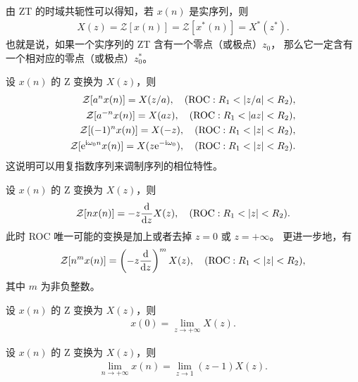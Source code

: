 \begin{corollary}
    由 ZT 的时域共轭性可以得知，若 $x(n)$ 是实序列，则
    \begin{align*}
        X(z) = \mathcal{Z}[x(n)] = \mathcal{Z}[x^*(n)] = X^*(z^*).
    \end{align*}
    也就是说，如果一个实序列的 ZT 含有一个零点（或极点）$z_0$，
    那么它一定含有一个相对应的零点（或极点）$z_0^*$。
\end{corollary}

\begin{property}[Z 域尺度变换]
    设 $x(n)$ 的 Z 变换为 $X(z)$，则
    \begin{align*}
        \mathcal{Z}[a^nx(n)] = X(z/a), \quad (\text{ROC}: R_1 < \left|z/a\right| < R_2), \\
        \mathcal{Z}[a^{-n}x(n)] = X(az), \quad (\text{ROC}: R_1 < \left|az\right| < R_2), \\
        \mathcal{Z}[(-1)^nx(n)] = X(-z), \quad (\text{ROC}: R_1 < \left|z\right| < R_2), \\
        \mathcal{Z}[\mathrm{e}^{\mathrm{i}\omega_0 n}x(n)] = X(z\mathrm{e}^{-\mathrm{i}\omega_0}), \quad (\text{ROC}: R_1 < \left|z\right| < R_2).
    \end{align*}
    这说明可以用复指数序列来调制序列的相位特性。
\end{property}

\begin{property}[Z 域的微分性质]
    设 $x(n)$ 的 Z 变换为 $X(z)$，则
    \begin{align*}
        \mathcal{Z}[nx(n)] = -z\frac{\D}{\D{z}}X(z), \quad (\text{ROC}: R_1 < \abs{z} < R_2).
    \end{align*}
    此时 ROC 唯一可能的变换是加上或者去掉 $z = 0$ 或 $z = +\infty$。
    更进一步地，有
    \begin{align*}
        \mathcal{Z}[n^mx(n)] = \left(-z\frac{\D}{\D{z}}\right)^m X(z), \quad (\text{ROC}: R_1 < \abs{z} < R_2),
    \end{align*}
    其中 $m$ 为非负整数。
\end{property}

\begin{property}[ZT 的初值定理]
    设 $x(n)$ 的 Z 变换为 $X(z)$，则
    \begin{align*}
        x(0) = \lim_{z \to +\infty} X(z).
    \end{align*}
\end{property}

\begin{property}[ZT 的终值定理]
    设 $x(n)$ 的 Z 变换为 $X(z)$，则
    \begin{align*}
        \lim_{n \to +\infty} x(n) = \lim_{z \to 1} (z - 1)X(z).
    \end{align*}
\end{property}

